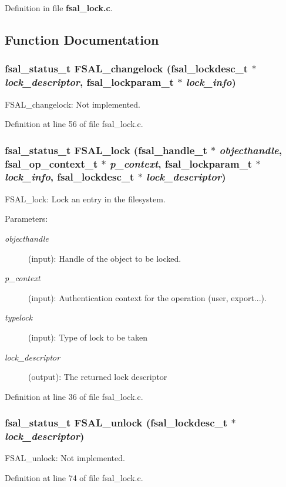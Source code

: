 Definition in file {\bf fsal\_\-lock.c}.

\subsection{Function Documentation}
\subsubsection{\setlength{\rightskip}{0pt plus 5cm}fsal\_\-status\_\-t FSAL\_\-changelock (fsal\_\-lockdesc\_\-t $\ast$ {\em lock\_\-descriptor}, fsal\_\-lockparam\_\-t $\ast$ {\em lock\_\-info})}\label{fsal__lock_8c_a1}


FSAL\_\-changelock: Not implemented. 

Definition at line 56 of file fsal\_\-lock.c.
\subsubsection{\setlength{\rightskip}{0pt plus 5cm}fsal\_\-status\_\-t FSAL\_\-lock (fsal\_\-handle\_\-t $\ast$ {\em objecthandle}, fsal\_\-op\_\-context\_\-t $\ast$ {\em p\_\-context}, fsal\_\-lockparam\_\-t $\ast$ {\em lock\_\-info}, fsal\_\-lockdesc\_\-t $\ast$ {\em lock\_\-descriptor})}\label{fsal__lock_8c_a0}


FSAL\_\-lock: Lock an entry in the filesystem.

\begin{Desc}
\item[Parameters:]
\begin{description}
\item[{\em objecthandle}](input): Handle of the object to be locked. \item[{\em p\_\-context}](input): Authentication context for the operation (user, export...). \item[{\em typelock}](input): Type of lock to be taken \item[{\em lock\_\-descriptor}](output): The returned lock descriptor \end{description}
\end{Desc}


Definition at line 36 of file fsal\_\-lock.c.
\subsubsection{\setlength{\rightskip}{0pt plus 5cm}fsal\_\-status\_\-t FSAL\_\-unlock (fsal\_\-lockdesc\_\-t $\ast$ {\em lock\_\-descriptor})}\label{fsal__lock_8c_a2}


FSAL\_\-unlock: Not implemented. 

Definition at line 74 of file fsal\_\-lock.c.